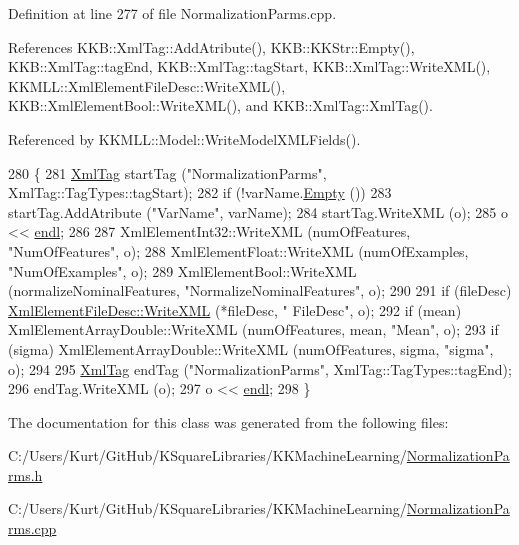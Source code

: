 Definition at line 277 of file Normalization\+Parms.\+cpp.



References K\+K\+B\+::\+Xml\+Tag\+::\+Add\+Atribute(), K\+K\+B\+::\+K\+K\+Str\+::\+Empty(), K\+K\+B\+::\+Xml\+Tag\+::tag\+End, K\+K\+B\+::\+Xml\+Tag\+::tag\+Start, K\+K\+B\+::\+Xml\+Tag\+::\+Write\+X\+M\+L(), K\+K\+M\+L\+L\+::\+Xml\+Element\+File\+Desc\+::\+Write\+X\+M\+L(), K\+K\+B\+::\+Xml\+Element\+Bool\+::\+Write\+X\+M\+L(), and K\+K\+B\+::\+Xml\+Tag\+::\+Xml\+Tag().



Referenced by K\+K\+M\+L\+L\+::\+Model\+::\+Write\+Model\+X\+M\+L\+Fields().


\begin{DoxyCode}
280 \{
281   \hyperlink{class_k_k_b_1_1_xml_tag}{XmlTag}  startTag (\textcolor{stringliteral}{"NormalizationParms"}, XmlTag::TagTypes::tagStart);
282   \textcolor{keywordflow}{if}  (!varName.\hyperlink{class_k_k_b_1_1_k_k_str_ac69942f73fffd672ec2a6e1c410afdb6}{Empty} ())
283     startTag.AddAtribute (\textcolor{stringliteral}{"VarName"}, varName);
284   startTag.WriteXML (o);
285   o << \hyperlink{namespace_k_k_b_ad1f50f65af6adc8fa9e6f62d007818a8}{endl};
286 
287   XmlElementInt32::WriteXML (numOfFeatures,             \textcolor{stringliteral}{"NumOfFeatures"},            o);
288   XmlElementFloat::WriteXML (numOfExamples,             \textcolor{stringliteral}{"NumOfExamples"},            o);
289   XmlElementBool::WriteXML  (normalizeNominalFeatures,  \textcolor{stringliteral}{"NormalizeNominalFeatures"}, o);
290 
291   \textcolor{keywordflow}{if}  (fileDesc)   \hyperlink{class_k_k_m_l_l_1_1_xml_element_file_desc_af1d6321393b529195a75f08e7aec0945}{XmlElementFileDesc::WriteXML}    (*fileDesc,             \textcolor{stringliteral}{"
      FileDesc"}, o);
292   \textcolor{keywordflow}{if}  (mean)       XmlElementArrayDouble::WriteXML (numOfFeatures, mean,   \textcolor{stringliteral}{"Mean"},     o);
293   \textcolor{keywordflow}{if}  (sigma)      XmlElementArrayDouble::WriteXML (numOfFeatures, sigma,  \textcolor{stringliteral}{"sigma"},    o);
294 
295   \hyperlink{class_k_k_b_1_1_xml_tag}{XmlTag}  endTag (\textcolor{stringliteral}{"NormalizationParms"}, XmlTag::TagTypes::tagEnd);
296   endTag.WriteXML (o);
297   o << \hyperlink{namespace_k_k_b_ad1f50f65af6adc8fa9e6f62d007818a8}{endl};
298 \}
\end{DoxyCode}


The documentation for this class was generated from the following files\+:\begin{DoxyCompactItemize}
\item 
C\+:/\+Users/\+Kurt/\+Git\+Hub/\+K\+Square\+Libraries/\+K\+K\+Machine\+Learning/\hyperlink{_normalization_parms_8h}{Normalization\+Parms.\+h}\item 
C\+:/\+Users/\+Kurt/\+Git\+Hub/\+K\+Square\+Libraries/\+K\+K\+Machine\+Learning/\hyperlink{_normalization_parms_8cpp}{Normalization\+Parms.\+cpp}\end{DoxyCompactItemize}
